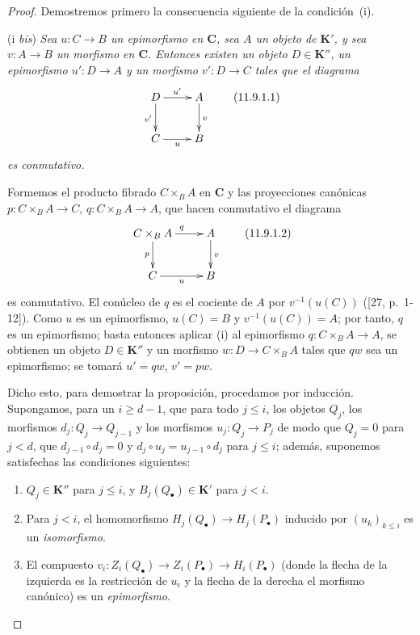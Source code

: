 \begin{proof}
Demostremos primero la consecuencia siguiente de la condición~(i).

\medskip\noindent
(i \emph{bis})
\emph{Sea $u:C\to B$ un epimorfismo en $\boldsymbol{C}$, sea $A$ un
objeto de $\boldsymbol{K}'$, y sea $v:A\to B$ un morfismo en $\boldsymbol{C}$.
Entonces existen un objeto $D\in\boldsymbol{K}''$, un epimorfismo $u':D\to A$ y un
morfismo $v':D\to C$ tales que el diagrama}
\[
\xymatrix{
D\ar[r]^{u'}\ar[d]_{v'} & A\ar[d]^{v}\\
C\ar[r]_{u} & B
}
\tag{11.9.1.1}\label{0.11.9.1.1-fr}
\]
\emph{es conmutativo.}

Formemos el producto fibrado $C\times_B A$ en $\boldsymbol{C}$ y las proyecciones canónicas $p:C\times_B A\to C$, $q:C\times_B A\to A$, que hacen conmutativo el diagrama
\[
\xymatrix{
C\times_B A\ar[r]^{q}\ar[d]_{p} & A\ar[d]^{v}\\
C\ar[r]_{u} & B
}
\tag{11.9.1.2}\label{0.11.9.1.2-fr}
\]
es conmutativo.
El conúcleo de $q$ es el cociente de $A$ por $v^{-1}(u(C))$
([27, p.~1-12]).
Como $u$ es un epimorfismo, $u(C)=B$ y
$v^{-1}(u(C))=A$; por tanto, $q$ es un epimorfismo; basta entonces aplicar (i) al epimorfismo $q:C\times_B A\to A$, se obtienen un objeto
$D\in\boldsymbol{K}''$ y un morfismo $w:D\to C\times_B A$ tales que $qw$ sea un epimorfismo; se tomará $u'=qw$, $v'=pw$.

Dicho esto, para demostrar la proposición, procedamos por inducción. Supongamos, para un $i\geq d-1$, que para todo $j\leq i$, los objetos $Q_j$, los morfismos $d_j:Q_j\to Q_{j-1}$ y los morfismos $u_j:Q_j\to P_j$ de modo que $Q_j=0$ para $j<d$, que $d_{j-1}\circ d_j=0$ y $d_j\circ u_j=u_{j-1}\circ d_j$ para $j\leq i$; además, suponemos satisfechas las condiciones siguientes:
\begin{enumerate}
\item[$(\mathrm I_i)$]
  $Q_j\in\boldsymbol{K}''$ para $j\leq i$, y
  $B_j(Q_\bullet)\in\boldsymbol{K}'$ para $j<i$.

  \item[$(\mathrm{II}_i)$]
  Para $j<i$, el homomorfismo
  $H_j(Q_\bullet)\to H_j(P_\bullet)$
  inducido por $(u_k)_{k\leq i}$ es un \emph{isomorfismo}.

  \item[$(\mathrm{III}_i)$]
  El compuesto
  $v_i:Z_i(Q_\bullet)\to Z_i(P_\bullet)
\to H_i(P_\bullet)$
(donde la flecha de la izquierda es la restricción de $u_i$ y la flecha de la derecha el morfismo canónico) es un \emph{epimorfismo}.
\end{enumerate}


\end{proof}
